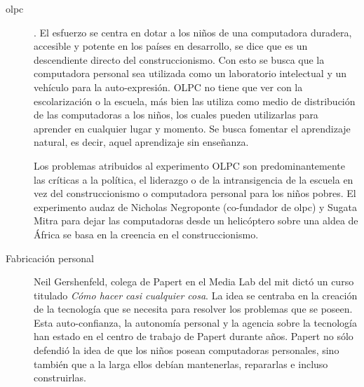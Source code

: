 \begin{description}



\item[\Gls{olpc}]. El esfuerzo se centra en dotar a los niños de una computadora
	duradera, accesible y potente en los países en desarrollo, se dice que
	es un descendiente directo del construccionismo. Con esto se busca que
	la computadora personal sea utilizada como un laboratorio intelectual y
	un vehículo para la auto-expresión. OLPC no tiene que ver con la
	escolarización o la escuela, más bien las utiliza como medio de
	distribución de las computadoras a los niños, los cuales pueden
	utilizarlas para aprender en cualquier lugar y momento. Se busca
	fomentar el aprendizaje natural, es decir, aquel aprendizaje sin
	enseñanza.

	Los problemas atribuidos al experimento OLPC son predominantemente las
	críticas a la política, el liderazgo o de la intransigencia de la
    escuela en vez del construccionismo o computadora personal para los niños
    pobres. El experimento audaz de Nicholas Negroponte (co-fundador de
    \Gls{olpc}) y Sugata Mitra para dejar las computadoras desde un helicóptero
    sobre una aldea de África se basa en la creencia en el
    construccionismo\cite{papertian:const}.

\item[Fabricación personal] Neil Gershenfeld, colega de Papert en el Media Lab
	del \Gls{mit} dictó un curso titulado \emph{Cómo hacer casi cualquier
		cosa}. La idea se centraba en la creación de  la tecnología que
	se necesita para resolver los problemas que se poseen. Esta
	auto-confianza, la autonomía personal y la agencia sobre la tecnología
	han estado en el centro de trabajo de Papert durante años. Papert no
	sólo defendió la idea de que los niños posean computadoras personales,
	sino también que a la larga ellos debían mantenerlas, repararlas e
	incluso construirlas.


\end{description}

